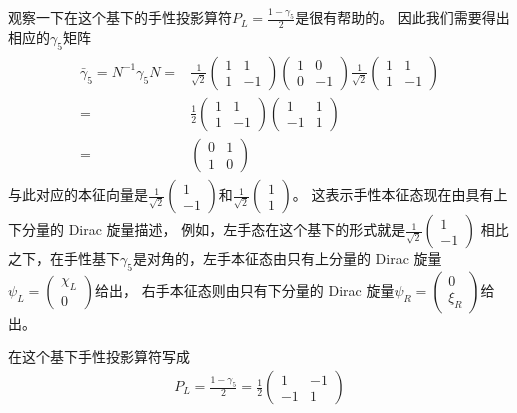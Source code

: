 观察一下在这个基下的手性投影算符$P_L=\frac{1-\gamma_5}{2}$是很有帮助的。
因此我们需要得出相应的$\gamma_5$矩阵
\begin{align}
\begin{split}
  \bar{\gamma}_5=N^{-1}\gamma_5N=&\frac{1}{\sqrt{2}}\begin{pmatrix}1&1\\1&-1\end{pmatrix}\begin{pmatrix}1&0\\0&-1\end{pmatrix}
  \frac{1}{\sqrt{2}}\begin{pmatrix}1&1\\1&-1\end{pmatrix}\\
  =&\frac{1}{2}\begin{pmatrix}1&1\\1&-1\end{pmatrix}\begin{pmatrix}1&1\\-1&1\end{pmatrix}\\
  =&\begin{pmatrix}0&1\\1&0\end{pmatrix}
\end{split}
\end{align}
与此对应的本征向量是$\frac{1}{\sqrt{2}}\begin{pmatrix}1\\-1\end{pmatrix}$和$\frac{1}{\sqrt{2}}\begin{pmatrix}1\\1\end{pmatrix}$。
这表示手性本征态现在由具有上下分量的 Dirac 旋量描述，
例如，左手态在这个基下的形式就是$\frac{1}{\sqrt{2}}\begin{pmatrix}1\\-1\end{pmatrix}$
相比之下，在手性基下$\gamma_5$是对角的，左手本征态由只有上分量的 Dirac 旋量$\psi_L=\begin{pmatrix}\chi_L\\0\end{pmatrix}$给出，
右手本征态则由只有下分量的 Dirac 旋量$\psi_R=\begin{pmatrix}0\\\xi_R\end{pmatrix}$给出。

在这个基下手性投影算符写成
\begin{align}
  P_L=\frac{1-\gamma_5}{2}=\frac{1}{2}\begin{pmatrix}1&-1\\-1&1\end{pmatrix}
\end{align}

